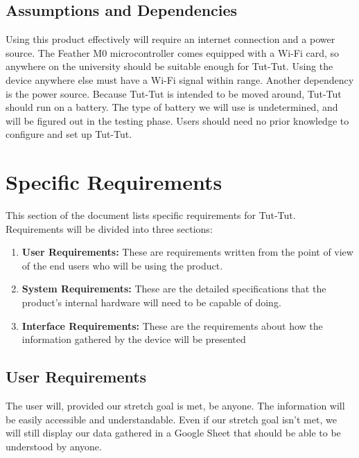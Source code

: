 \documentclass[letterpaper,10pt,draftclsnofoot,onecolumn]{article}
\begin{document}
\subsection{Assumptions and Dependencies}
Using this product effectively will require an internet connection and a power source. The Feather M0 microcontroller comes equipped with a Wi-Fi card, so anywhere on the university should be suitable enough for Tut-Tut. Using the device anywhere else must have a Wi-Fi signal within range. Another dependency is the power source. Because Tut-Tut is intended to be moved around, Tut-Tut should run on a battery. The type of battery we will use is undetermined, and will be figured out in the testing phase. Users should need no prior knowledge to configure and set up Tut-Tut.

\section{Specific Requirements}
This section of the document lists specific requirements for Tut-Tut. Requirements will be divided into three sections:
\begin{enumerate}
    \item \textbf{User Requirements: } These are requirements written from the point of view of the end users who will be using the product.
    \item \textbf{System Requirements: } These are the detailed specifications that the product's internal hardware will need to be capable of doing.
    \item \textbf{Interface Requirements: } These are the requirements about how the information gathered by the device will be presented 
\end{enumerate}

\subsection{User Requirements}
The user will, provided our stretch goal is met, be anyone. The information will be easily accessible and understandable. Even if our stretch goal isn't met, we will still display our data gathered in a Google Sheet that should be able to be understood by anyone.
\end{document}
